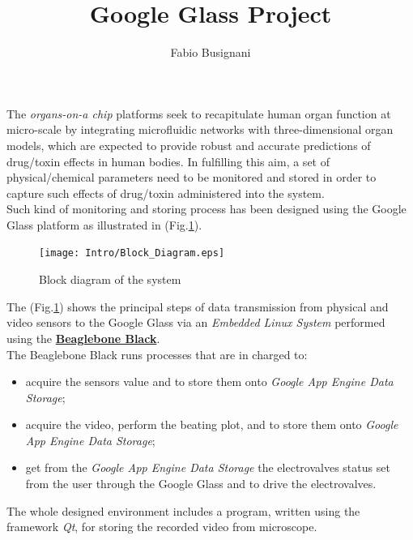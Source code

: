 \documentclass[12pt,a4paper,twoside]{article}
\author{Fabio Busignani}
\title{Google Glass Project}
\begin{document}
	\maketitle
	\clearpage
	The \textit{organs-on-a chip} platforms seek to recapitulate human organ function at micro-scale by integrating microfluidic networks with three-dimensional organ models, which are expected to provide robust and accurate predictions of drug/toxin effects in human bodies. In fulfilling this aim, a set of physical/chemical parameters need to be monitored and stored in order to capture such effects of drug/toxin administered into the system.\\
	Such kind of monitoring and storing process has been designed using the Google Glass platform as illustrated in (Fig.\ref{Fig:BlockDiagram}).
	
	\begin{figure}[h]
		\centering
		\texttt{[image: Intro/Block\_Diagram.eps]}
		\caption{Block diagram of the system}
		\label{Fig:BlockDiagram}
		
	\end{figure}
	
	The (Fig.\ref{Fig:BlockDiagram}) shows the principal steps of data transmission from physical and video sensors to the Google Glass via an \textit{Embedded Linux System} performed using the \href{http://beagleboard.org/BLACK}{\textbf{Beaglebone Black}}.\\
	The Beaglebone Black runs processes that are in charged to:
	\begin{itemize}
		\item acquire the sensors value and to store them onto \textit{Google App Engine Data Storage};
		\item acquire the video, perform the beating plot, and to store them onto \textit{Google App Engine Data Storage};
		\item get from the \textit{Google App Engine Data Storage} the electrovalves status set from the user through the Google Glass and to drive the electrovalves.
	\end{itemize} 
	
	The whole designed environment includes a program, written using the framework \textit{Qt}, for storing the recorded video from microscope.
	
\end{document}
